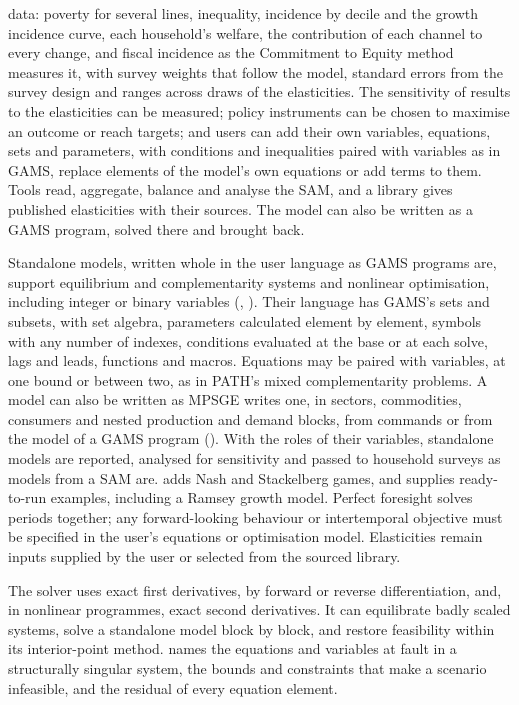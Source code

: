 data: poverty for several lines, inequality, incidence by decile and the
growth incidence curve, each household's welfare, the contribution of each
channel to every change, and fiscal incidence as the Commitment to Equity
method measures it, with survey weights that follow the model, standard
errors from the survey design and ranges across draws of the elasticities.
The sensitivity of results to the elasticities can be measured; policy
instruments can be chosen to maximise an outcome or reach targets; and users
can add their own variables, equations, sets and parameters, with conditions
and inequalities paired with variables as in GAMS, replace elements of the
model's own equations or add terms to them. Tools read, aggregate, balance and
analyse the SAM, and a library gives published elasticities with their
sources. The model can also be written as a GAMS program, solved there and
brought back.

Standalone models, written whole in the user language as GAMS programs are,
support equilibrium and complementarity systems and nonlinear optimisation,
including integer or binary variables (,
). Their language has GAMS's sets and subsets, with set
algebra, parameters calculated element by element, symbols with any number
of indexes, conditions evaluated at the base or at each solve, lags and
leads, functions and macros. Equations may be paired with variables, at one
bound or between two, as in PATH's mixed complementarity problems. A model
can also be written as MPSGE writes one, in sectors, commodities, consumers
and nested production and demand blocks, from commands or from the model of
a GAMS program (). With the roles of their variables,
standalone models are reported, analysed for sensitivity and passed to
household surveys as models from a SAM are.  adds Nash and
Stackelberg games, and  supplies ready-to-run examples,
including a Ramsey growth model. Perfect foresight solves periods together;
any forward-looking behaviour or intertemporal objective must be specified
in the user's equations or optimisation model. Elasticities remain inputs
supplied by the user or selected from the sourced library.

The solver uses exact first derivatives, by forward or reverse
differentiation, and, in nonlinear programmes, exact second derivatives. It
can equilibrate badly scaled systems, solve a standalone model block by
block, and restore feasibility within its interior-point method.
 names the equations and variables at fault in a
structurally singular system,  the bounds and constraints
that make a scenario infeasible, and  the residual of
every equation element.

